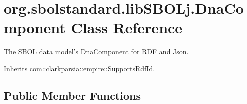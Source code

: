\hypertarget{classorg_1_1sbolstandard_1_1lib_s_b_o_lj_1_1_dna_component}{
\section{org.sbolstandard.libSBOLj.DnaComponent Class Reference}
\label{classorg_1_1sbolstandard_1_1lib_s_b_o_lj_1_1_dna_component}
}


The SBOL data model's \hyperlink{classorg_1_1sbolstandard_1_1lib_s_b_o_lj_1_1_dna_component}{DnaComponent} for RDF and Json.  




Inherits com::clarkparsia::empire::SupportsRdfId.

\subsection*{Public Member Functions}
